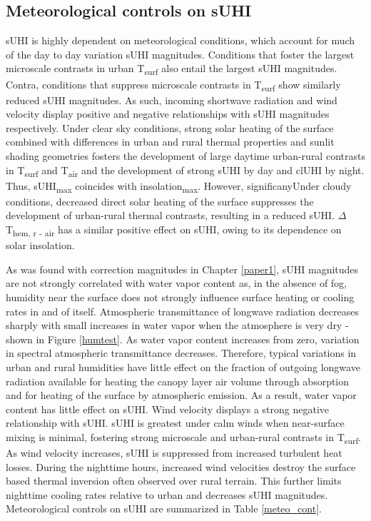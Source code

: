 \begin{bibunit}
\subsection{Meteorological controls on sUHI}

sUHI is highly dependent on meteorological conditions, which account for much of the day to day variation sUHI magnitudes. Conditions that foster the largest microscale contrasts in urban T\textsubscript{surf} also entail the largest sUHI magnitudes. Contra, conditions that suppress microscale contrasts in T\textsubscript{surf} show similarly reduced sUHI magnitudes. As such, incoming shortwave radiation and wind velocity display positive and negative relationships with sUHI magnitudes respectively. Under clear sky conditions, strong solar heating of the surface combined with differences in urban and rural thermal properties and sunlit shading geometries fosters the development of large daytime urban-rural contrasts in T\textsubscript{surf} and T\textsubscript{air} and the development of strong sUHI by day and clUHI by night. Thus, sUHI\textsubscript{max} coincides with insolation\textsubscript{max}. However, significanyUnder cloudy conditions, decreased direct solar heating of the surface suppresses the development of urban-rural thermal contrasts, resulting in a reduced sUHI. $\Delta$T\textsubscript{hem, r - air} has a similar positive effect on sUHI, owing to its dependence on solar insolation. 

As was found with correction magnitudes in Chapter \ref{paper1}, sUHI magnitudes are not strongly correlated with water vapor content as, in the absence of fog, humidity near the surface does not strongly influence surface heating or cooling rates in and of itself. Atmospheric transmittance of longwave radiation decreases sharply with small increases in water vapor when the atmosphere is very dry - shown in Figure \ref{humtest}. As water vapor content increases from zero, variation in spectral atmospheric transmittance decreases. Therefore, typical variations in urban and rural humidities have little effect on the fraction of outgoing longwave radiation available for heating the canopy layer air volume through absorption and for heating of the surface by atmospheric emission. As a result, water vapor content has little effect on sUHI. Wind velocity displays a strong negative relationship with sUHI. sUHI is greatest under calm winds when near-surface mixing is minimal, fostering strong microscale and urban-rural contrasts in T\textsubscript{surf}. As wind velocity increases, sUHI is suppressed from increased turbulent heat losses. During the nighttime hours, increased wind velocities destroy the surface based thermal inversion often observed over rural terrain. This further limits nighttime cooling rates relative to urban and decreases sUHI magnitudes. Meteorological controls on sUHI are summarized in Table \ref{meteo_cont}.


\end{bibunit}
